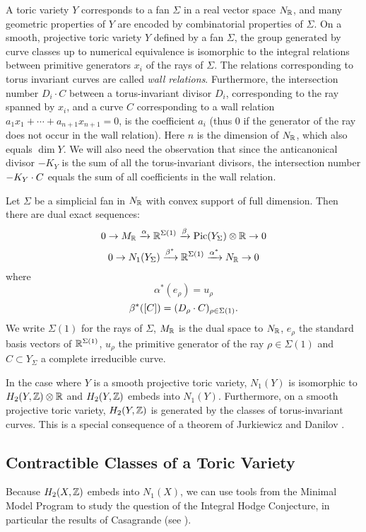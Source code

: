 A toric variety $Y$ corresponds to a fan $\Sigma$ in a real vector space $N_{\mathbb{R}}$, and many geometric properties of $Y$ are encoded by combinatorial properties of $\Sigma$. On a smooth, projective toric variety $Y$ defined by a fan $\Sigma$, the group generated by curve classes up to  numerical equivalence is isomorphic to the integral relations between primitive generators $x_i$ of the rays of $\Sigma$. The relations corresponding to torus invariant curves are called \emph{wall relations}. Furthermore, the intersection number $D_i \cdot C$ between a torus-invariant divisor $D_i$, corresponding to the ray spanned by $x_i$, and a curve $C$ corresponding to a wall relation $a_1x_1 + \cdots + a_{n+1}x_{n+1} = 0$, is the coefficient $a_i$ (thus 0 if the generator of the ray does not occur in the wall relation). Here $n$ is the dimension of $N_{\mathbb{R}}$, which also equals $\dim{Y}$. We will also need the observation that  since the anticanonical divisor $-K_Y$ is the sum of all the torus-invariant divisors, the intersection number $-K_Y \cdot C$ equals the sum of all coefficients in the wall relation.

\begin{proposition}
  Let $\Sigma$ be a simplicial fan in $N_{\mathbb{R}}$ with convex support of full dimension. Then there are dual exact sequences:
\[ 0 \to M_{\mathbb{R}} \xrightarrow{\alpha} \mathbb{R}^{\Sigma(1)} \xrightarrow{\beta} \operatorname{Pic}(Y_\Sigma) \otimes \mathbb{R} \to 0 \]
\[ 0 \to N_1(Y_\Sigma) \xrightarrow{\beta^*} \mathbb{R}^{\Sigma(1)} \xrightarrow{\alpha^*} N_{\mathbb{R}} \to 0 \]
where
\[ \alpha^*(e_\rho) = u_\rho \]
\[ \beta^*([C]) = (D_\rho \cdot C)_{\rho \in \Sigma(1)}.\]
We write $\Sigma(1)$ for the rays of $\Sigma$, $M_{\mathbb{R}}$ is the dual space to $N_{\mathbb{R}}$, $e_\rho$ the standard basis vectors of $\mathbb{R}^{\Sigma(1)}$, $u_\rho$ the primitive generator of the ray $\rho \in \Sigma(1)$ and $C \subset Y_\Sigma$ a complete irreducible curve.
\end{proposition}

In the case where $Y$ is a smooth projective toric variety, $N_1(Y)$ is isomorphic to $H_2(Y,\mathbb{Z}) \otimes \mathbb{R}$ and $H_2(Y,\mathbb{Z})$ embeds into $N_1(Y)$. Furthermore, on a smooth projective toric variety, $H_2(Y,\mathbb{Z})$ is generated by the classes of torus-invariant curves. This is a special consequence of a theorem of Jurkiewicz and Danilov \cite[Theorem 12.4.4]{CLS11}.



\subsection{Contractible Classes of a Toric Variety}
Because $H_2(X,\mathbb{Z})$ embeds into $N_1(X)$, we can use tools from the Minimal Model Program to study the question of the Integral Hodge Conjecture, in particular the results of Casagrande (see \cite{Casagrande}).

